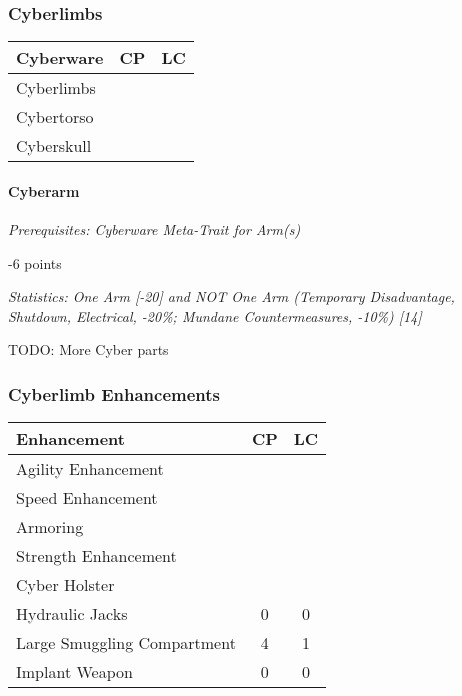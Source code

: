 \begin{multicols*}{3}
	\subsubsection{Cyberlimbs}
	
	\begin{center}
		\begin{tabularx}{0.32\textwidth}{|X|c|c|}
			\hline
			Cyberware & CP & LC\\
			\hline
			\hline
			Cyberlimbs & & \\
			Cybertorso & & \\
			Cyberskull & & \\
			\hline
		\end{tabularx}
	\end{center}
	
	\paragraph{Cyberarm}
	\textit{Prerequisites:  Cyberware Meta-Trait for Arm(s)}
	\begin{flushright}
		-6 points
	\end{flushright}
	
	\textit{\textcolor{OliveGreen}{Statistics: One Arm [-20] and NOT One Arm (Temporary Disadvantage, Shutdown, Electrical, -20\%; Mundane Countermeasures, -10\%) [14]}}
	
	TODO:  More Cyber parts
	
	\subsubsection{Cyberlimb Enhancements}
	
	\begin{center}
		\begin{tabularx}{0.32\textwidth}{|X|c|c|}
			\hline
			Enhancement & CP & LC\\
			\hline
			\hline
			Agility Enhancement & & \\
			Speed Enhancement & & \\
			Armoring & & \\
			Strength Enhancement & & \\
			Cyber Holster & & \\
			Hydraulic Jacks & 0 & 0\\
			Large Smuggling Compartment & 4 & 1\\
			Implant Weapon & 0 & 0\\
			\hline
		\end{tabularx}
	\end{center}
	

\end{multicols*}
